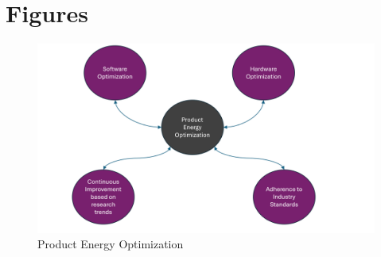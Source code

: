 \documentclass[12pt]{article}
\begin{document}
\section*{Figures}
\begin{figure}[h]
  \centering
  \includegraphics[width = \textwidth]{product_energy_optimization.png}
  \caption{Product Energy Optimization}
\end{figure}

\newpage
\printbibliography
\end{document}
